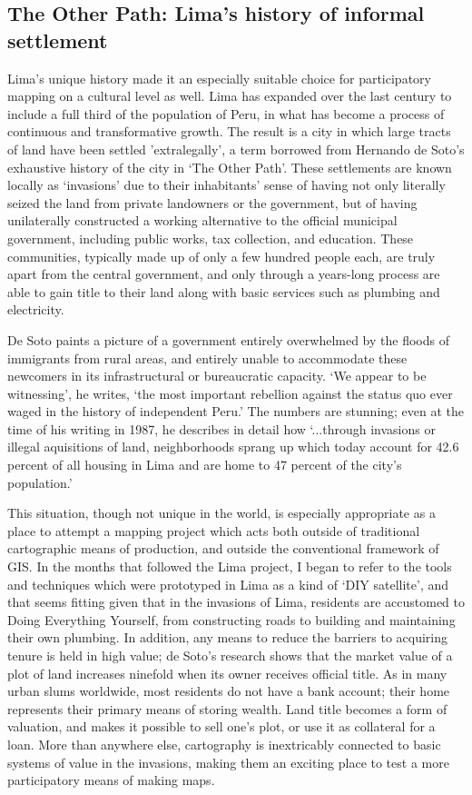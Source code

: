 \documentclass[11pt,oneside,notitlepage]{report}
\begin{document}
\subsection{The Other Path: Lima's history of informal settlement}

Lima's unique history made it an especially suitable choice for participatory mapping on a cultural level as well. Lima has expanded over the last century to include a full third of the population of Peru, in what has become a process of continuous and transformative growth. The result is a city in which large tracts of land have been settled 'extralegally', a term borrowed from Hernando de Soto's exhaustive history of the city in `The Other Path'. These settlements are known locally as `invasions' due to their inhabitants' sense of having not only literally seized the land from private landowners or the government, but of having unilaterally constructed a working alternative to the official municipal government, including public works, tax collection, and education. These communities, typically made up of only a few hundred people each, are truly apart from the central government, and only through a years-long process are able to gain title to their land along with basic services such as plumbing and electricity.

De Soto paints a picture of a government entirely overwhelmed by the floods of immigrants from rural areas, and entirely unable to accommodate these newcomers in its infrastructural or bureaucratic capacity. `We appear to be witnessing', he writes, `the most important rebellion against the status quo ever waged in the history of independent Peru.' The numbers are stunning; even at the time of his writing in 1987, he describes in detail how `...through invasions or illegal aquisitions of land, neighborhoods sprang up which today account for 42.6 percent of all housing in Lima and are home to 47 percent of the city's population.' \cite{desoto1987sendero}

This situation, though not unique in the world, is especially appropriate as a place to attempt a mapping project which acts both outside of traditional cartographic means of production, and outside the conventional framework of GIS. In the months that followed the Lima project, I began to refer to the tools and techniques which were prototyped in Lima as a kind of `DIY satellite', and that seems fitting given that in the invasions of Lima, residents are accustomed to Doing Everything Yourself, from constructing roads to building and maintaining their own plumbing. In addition, any means to reduce the barriers to acquiring tenure is held in high value; de Soto's research shows that the market value of a plot of land increases ninefold when its owner receives official title. As in many urban slums worldwide, most residents do not have a bank account; their home represents their primary means of storing wealth. Land title becomes a form of valuation, and makes it possible to sell one's plot, or use it as collateral for a loan. More than anywhere else, cartography is inextricably connected to basic systems of value in the invasions, making them an exciting place to test a more participatory means of making maps. 
\end{document}
